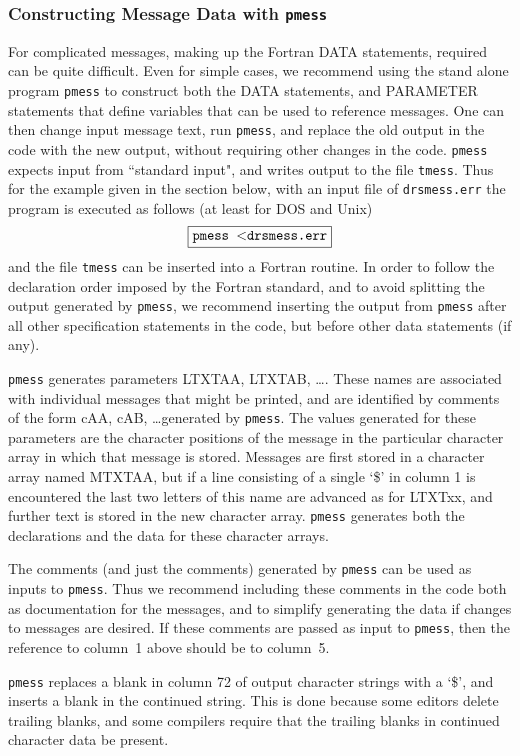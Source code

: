 \documentclass[twoside]{MATH77}
\begin{document}
\subsubsection{Constructing Message Data with {\tt pmess}}
For complicated messages, making up the Fortran DATA statements,
required can be quite difficult.  Even for simple cases, we recommend
using the stand alone program {\tt pmess} to construct both the DATA
statements, and PARAMETER statements that define variables that can
be used to reference messages.  One can then change input message
text, run {\tt pmess}, and replace the old output in the code with the new
output, without requiring other changes in the code.  {\tt pmess} expects
input from ``standard input", and writes output to the file {\tt tmess}.
Thus for the example given in the section below, with an input file
of {\tt drsmess.err} the program is executed as follows (at least for DOS
and Unix)
$$
\fbox{{\bf \tt pmess $<$drsmess.err}}
$$
and the file {\tt tmess} can be inserted into a Fortran routine.  In order to
follow the declaration order imposed by the Fortran standard, and to
avoid splitting the output generated by {\tt pmess}, we recommend inserting the
output from {\tt pmess} after all other specification statements in the code,
but before other data statements (if any).

{\tt pmess} generates parameters LTXTAA, LTXTAB, \ldots .  These names are
associated with individual messages that might be printed, and are
identified by comments of the form cAA, cAB, \ldots generated by {\tt pmess}.
The values generated for these parameters are the character positions of
the message in the particular character array in which that message is
stored.  Messages are first stored in a character array named MTXTAA, but
if a line consisting of a single `\$' in column 1 is encountered the last
two letters of this name are advanced as for LTXTxx, and further text is
stored in the new character array.  {\tt pmess} generates both the declarations
and the data for these character arrays.

The comments (and just the comments) generated by {\tt pmess} can be used as
inputs to {\tt pmess}.  Thus we recommend including these comments in the code
both as documentation for the messages, and to simplify generating the
data if changes to messages are desired.  If these comments are passed as
input to {\tt pmess}, then the reference to column~1 above should be to
column~5.

{\tt pmess} replaces a blank in column 72 of output character strings with a
`\$', and inserts a blank in the continued string.  This is done because
some editors delete trailing blanks, and some compilers require that the
trailing blanks in continued character data be present.
\end{document}
